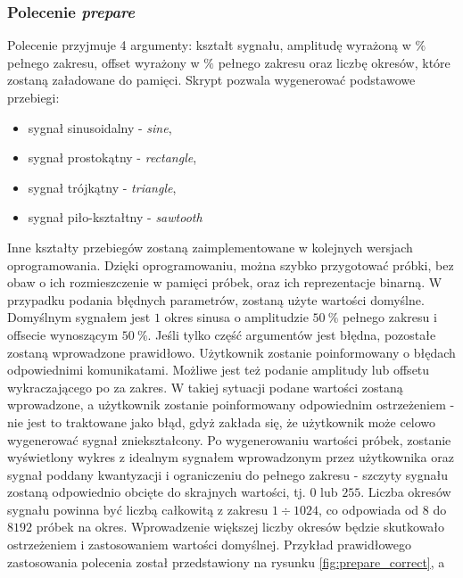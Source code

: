         \subsubsection{Polecenie \textit{prepare}}
            Polecenie przyjmuje 4 argumenty: kształt sygnału, amplitudę wyrażoną w $\%$ pełnego zakresu, offset wyrażony w 
            $\%$ pełnego zakresu oraz liczbę okresów, które zostaną załadowane do pamięci. 
            Skrypt pozwala wygenerować podstawowe przebiegi: 
            \begin{itemize}
                \item sygnał sinusoidalny - \textit{sine},
                \item sygnał prostokątny - \textit{rectangle},
                \item sygnał trójkątny - \textit{triangle},
                \item sygnał piło-kształtny - \textit{sawtooth}
            \end{itemize}
            Inne kształty przebiegów zostaną zaimplementowane w kolejnych wersjach oprogramowania. 
            Dzięki oprogramowaniu, można szybko przygotować próbki, bez obaw o ich rozmieszczenie w pamięci próbek, 
            oraz ich reprezentacje binarną. W przypadku podania błędnych parametrów, zostaną użyte wartości 
            domyślne. Domyślnym sygnałem jest $1$ okres sinusa o amplitudzie $50\ \%$ pełnego zakresu i offsecie 
            wynoszącym $50\ \%$. Jeśli tylko część argumentów jest błędna, pozostałe zostaną wprowadzone prawidłowo. 
            Użytkownik zostanie poinformowany o błędach odpowiednimi komunikatami. Możliwe jest też podanie 
            amplitudy lub offsetu wykraczającego po za zakres. W takiej sytuacji podane wartości zostaną wprowadzone, a 
            użytkownik zostanie poinformowany odpowiednim ostrzeżeniem - nie jest to traktowane jako błąd, gdyż zakłada się, że 
            użytkownik może celowo wygenerować sygnał zniekształcony. Po wygenerowaniu wartości próbek, zostanie wyświetlony 
            wykres z idealnym sygnałem wprowadzonym przez użytkownika oraz sygnał poddany kwantyzacji i ograniczeniu 
            do pełnego zakresu - szczyty sygnału zostaną odpowiednio obcięte do skrajnych wartości, tj. $0$ lub $255$. 
            Liczba okresów sygnału powinna być liczbą całkowitą z zakresu $1 \div 1024$, co odpowiada od $8$ do $8192$ próbek na okres. 
            Wprowadzenie większej liczby okresów będzie skutkowało ostrzeżeniem i zastosowaniem wartości domyślnej.
            Przykład prawidłowego zastosowania polecenia został przedstawiony na rysunku \ref{fig:prepare_correct}, a 
